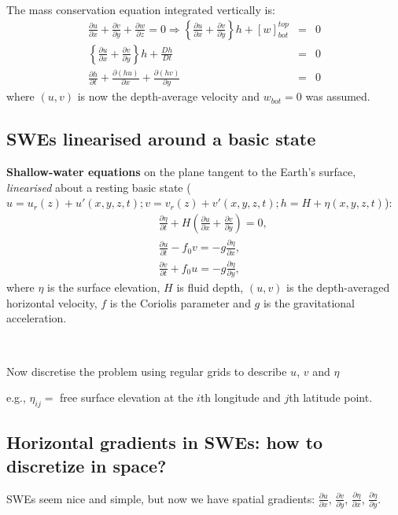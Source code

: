 \documentclass[11pt,fleqn]{book} %
\newcommand{\partd}[2]{\frac{\partial #1}{\partial #2}}
\newcommand{\lagd}[2]{\frac{D #1}{D #2}}
\begin{document}
	The mass conservation equation integrated vertically is:
	\begin{eqnarray*}
		\partd{u}{x}+\partd{v}{y}+\partd{w}{z} = 0 \Rightarrow \left\{ \partd{u}{x}+\partd{v}{y} \right\} h+[w]^{top}_{bot} & = & 0 \\
		\left\{ \partd{u}{x}+\partd{v}{y} \right\} h+\lagd{h}{t} & = & 0 \\
		\partd{h}{t}+\partd{(hu)}{x}+\partd{(hv)}{y} & = & 0
	\end{eqnarray*}
	where $(u,v)$ is now the depth-average velocity and $w_{bot}=0$ was assumed. 
	

\subsection{SWEs linearised around a basic state} 
	
	{\bf Shallow-water equations} on the
	plane tangent to the Earth's surface, {\em linearised} about a resting basic state ($u=u_r(z)+u'(x,y,z,t); v=v_r(z)+v'(x,y,z,t);h=H+\eta(x,y,z,t)$):
	\begin{eqnarray}
		&&\frac{\partial \eta}{\partial t} + H \left(
		\frac{\partial u}{\partial x}+\frac{\partial v}{\partial y}\right) = 0,
		\\
		&&\frac{\partial u}{\partial t} - f_0 v = - g\frac{\partial \eta}{\partial x}, \\
		&&\frac{\partial v}{\partial t} + f_0 u = - g\frac{\partial \eta}{\partial y}, 
	\end{eqnarray}
	where $\eta$ is the surface elevation, $H$ is fluid depth, $(u,v)$ is
	the depth-averaged horizontal velocity, $f$ is the Coriolis parameter
	and $g$ is the gravitational acceleration. 
	
	~~
	
	Now discretise the problem using regular grids to describe $u$, $v$ and $\eta$ 
	
	e.g., $\eta_{ij}=$ free surface elevation at the $i$th longitude and $j$th
	latitude point.

\subsection { Horizontal gradients in SWEs: how to discretize in space?} 

	SWEs seem nice and simple, but now we have spatial gradients: $\frac{\partial u}{\partial x}$, $\frac{\partial v}{\partial y}$, $\frac{\partial \eta}{\partial x}$, $\frac{\partial \eta}{\partial y}$.\\
	
\end{document}
